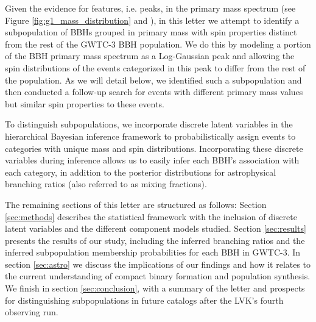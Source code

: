 Given the evidence for features, i.e. peaks, in the primary mass spectrum (see Figure \ref{fig:g1_mass_distribution} and \citet{2111.03634, 2022ApJ...928..155T, 10.3847/2041-8213/aa9bf6, 10.3847/1538-4357/aab34c, 10.3847/2041-8213/ab3800, 2021ApJ...913L...7A}), in this letter we attempt to identify a subpopulation of BBHs grouped in primary mass with spin properties distinct from the rest of the GWTC-3 BBH population. We do this by modeling a portion of the BBH primary mass spectrum as a Log-Gaussian peak and allowing the spin distributions of the events categorized in this peak to differ from the rest of the population. As we will detail below, we identified such a subpopulation and then conducted a follow-up search for events with different primary mass values but similar spin properties to these events.

To distinguish subpopulations, we incorporate discrete latent variables in the hierarchical Bayesian inference framework to probabilistically assign events to categories with unique mass and spin distributions. Incorporating these discrete variables during inference allows us to easily infer each BBH's association with each category, in addition to the posterior distributions for astrophysical branching ratios (also referred to as mixing fractions).

The remaining sections of this letter are structured as follows: Section \ref{sec:methods} describes the statistical framework with the inclusion of discrete latent variables and the different component models studied. Section \ref{sec:results} presents the results of our study, including the inferred branching ratios and the inferred subpopulation membership probabilities for each BBH in GWTC-3. In section \ref{sec:astro} we discuss the implications of our findings and how it relates to the current understanding of compact binary formation and population synthesis. We finish in section \ref{sec:conclusion}, with a summary of the letter and prospects for distinguishing subpopulations in future catalogs after the LVK's fourth observing run. 